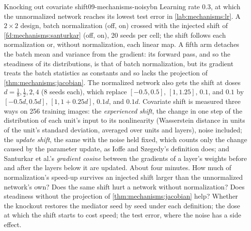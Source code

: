 \begin{refsection}
\begin{lab}{Knocking out covariate shift}{09-mechanisms-noisybn}\label{lab:mechanisms:noisybn}
 Learning rate $0.3$, at which the unnormalized network reaches its lowest test error in \cref{lab:mechanisms:lr}. A $2\times2$ design, batch normalization (off, on) crossed with the injected shift of \cref{fd:mechanisms:santurkar} (off, on), 20 seeds per cell; the shift follows each normalization or, without normalization, each linear map. A fifth arm detaches the batch mean and variance from the gradient: its forward pass, and so the steadiness of its distributions, is that of batch normalization, but its gradient treats the batch statistics as constants and so lacks the projection of \cref{thm:mechanisms:jacobian}. The normalized network also gets the shift at doses $d=\frac18,\frac12,2,4$ (8 seeds each), which replace $[-0.5,0.5]$, $[1,1.25]$, $0.1$, and $0.1$ by $[-0.5d,0.5d]$, $[1,1+0.25d]$, $0.1d$, and $0.1d$. Covariate shift is measured three ways on 256 training images: the \emph{experienced shift}, the change in one step of the distribution of each unit's input to its nonlinearity (Wasserstein distance in units of the unit's standard deviation, averaged over units and layers), noise included; the \emph{update shift}, the same with the noise held fixed, which counts only the change caused by the parameter update, as Ioffe and Szegedy's definition does; and Santurkar et al.'s \emph{gradient cosine} between the gradients of a layer's weights before and after the layers below it are updated. About four minutes.
 How much of normalization's speed-up survives an injected shift larger than the unnormalized network's own? Does the same shift hurt a network without normalization? Does steadiness without the projection of \cref{thm:mechanisms:jacobian} help?
 Whether the knockout restores the mediator seed by seed under each definition; the dose at which the shift starts to cost speed; the test error, where the noise has a side effect.
\end{lab}


\end{refsection}
